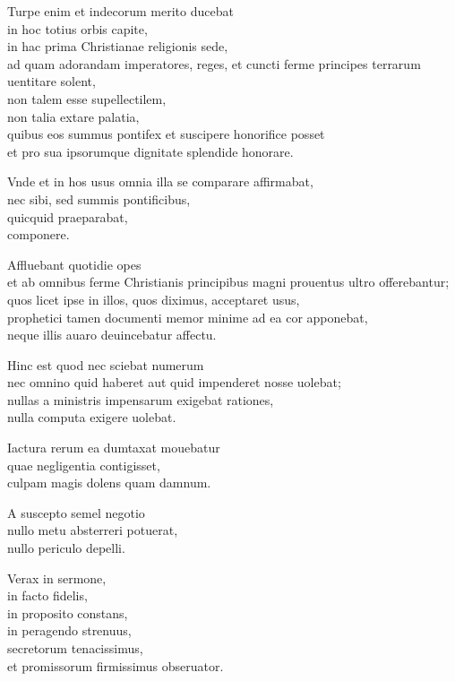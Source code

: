 \documentclass[a5paper,twoside]{article}
\begin{document}
Turpe enim et indecorum merito ducebat \\
in hoc totius orbis capite, \\
in hac prima Christianae religionis sede, \\
ad quam adorandam imperatores, reges, et cuncti ferme principes terrarum uentitare solent, \\
non talem esse supellectilem, \\
non talia extare palatia, \\
quibus eos summus pontifex et suscipere honorifice posset \\
et pro sua ipsorumque dignitate splendide honorare. 

Vnde et in hos usus omnia illa se comparare affirmabat, \\
nec sibi, sed summis pontificibus, \\
quicquid praeparabat, \\
componere. 

Affluebant quotidie opes \\
et ab omnibus ferme Christianis principibus magni prouentus ultro offerebantur; \\
quos licet ipse in illos, quos diximus, acceptaret usus, \\
prophetici tamen documenti memor minime ad ea cor apponebat, \\
neque illis auaro deuincebatur affectu. 

Hinc est quod nec sciebat numerum \\
nec omnino quid haberet aut quid impenderet nosse uolebat; \\
nullas a ministris impensarum exigebat rationes, \\
nulla computa exigere uolebat. 

Iactura rerum ea dumtaxat mouebatur \\
quae negligentia contigisset, \\
culpam magis dolens quam damnum. 

A suscepto semel negotio \\
nullo metu absterreri potuerat, \\
nullo periculo depelli. 

Verax in sermone, \\
in facto fidelis, \\
in proposito constans, \\
in peragendo strenuus, \\
secretorum tenacissimus, \\
et promissorum firmissimus obseruator. 
\end{document}
